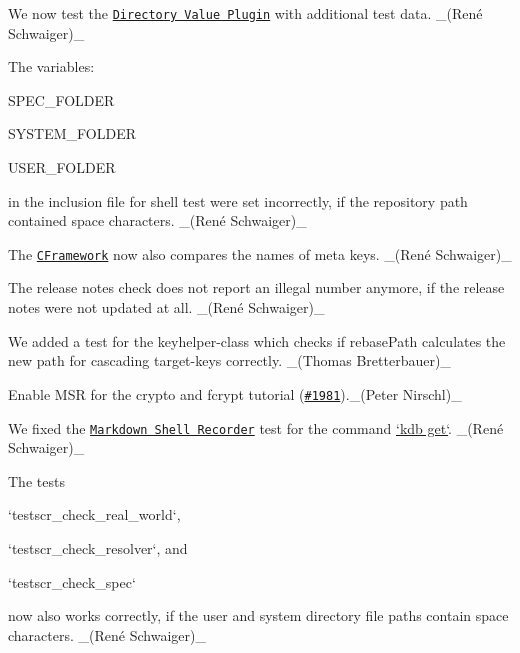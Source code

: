 \begin{DoxyItemize}
\item We now test the \href{https://www.libelektra.org/plugins/directoryvalue}{\tt Directory Value Plugin} with additional test data. \+\_\+(René Schwaiger)\+\_\+
\item The variables\+:
\begin{DoxyItemize}
\item {\ttfamily S\+P\+E\+C\+\_\+\+F\+O\+L\+D\+ER}
\item {\ttfamily S\+Y\+S\+T\+E\+M\+\_\+\+F\+O\+L\+D\+ER}
\item {\ttfamily U\+S\+E\+R\+\_\+\+F\+O\+L\+D\+ER}
\end{DoxyItemize}

in the inclusion file for shell test were set incorrectly, if the repository path contained space characters. \+\_\+(René Schwaiger)\+\_\+
\item The \href{https://master.libelektra.org/tests/cframework}{\tt C\+Framework} now also compares the names of meta keys. \+\_\+(René Schwaiger)\+\_\+
\item The release notes check does not report an illegal number anymore, if the release notes were not updated at all. \+\_\+(René Schwaiger)\+\_\+
\item We added a test for the keyhelper-\/class which checks if rebase\+Path calculates the new path for cascading target-\/keys correctly. \+\_\+(\+Thomas Bretterbauer)\+\_\+
\item Enable M\+SR for the crypto and fcrypt tutorial (\href{https://github.com/ElektraInitiative/libelektra/issues/1981}{\tt \#1981}).\+\_\+(\+Peter Nirschl)\+\_\+
\item We fixed the \href{https://master.libelektra.org/tests/shell/shell_recorder/tutorial_wrapper}{\tt Markdown Shell Recorder} test for the command \hyperlink{doc_help_kdb-get_md}{`kdb get`}. \+\_\+(René Schwaiger)\+\_\+
\item The tests
\begin{DoxyItemize}
\item `testscr\+\_\+check\+\_\+real\+\_\+world`,
\item `testscr\+\_\+check\+\_\+resolver`, and
\item `testscr\+\_\+check\+\_\+spec`
\end{DoxyItemize}

now also works correctly, if the {\ttfamily user} and {\ttfamily system} directory file paths contain space characters. \+\_\+(René Schwaiger)\+\_\+
\end{DoxyItemize}

